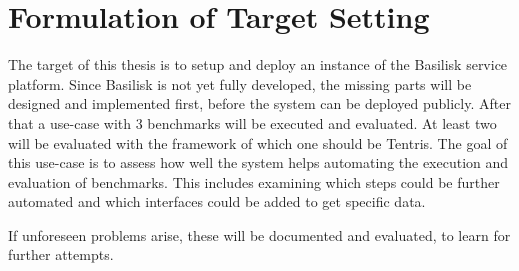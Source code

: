 \chapter{Formulation of Target Setting}
\label{ch:target_setting}

The target of this thesis is to setup and deploy an instance of the Basilisk service platform.
Since Basilisk is not yet fully developed, the missing parts will be designed and implemented first, before the system can be deployed publicly.
After that a use-case with 3 benchmarks will be executed and evaluated.
At least two \tsp{} will be evaluated with the framework of which one should be Tentris\cite{tentris}.
The goal of this use-case is to assess how well the system helps automating the execution and evaluation of benchmarks.
This includes examining which steps could be further automated and which interfaces could be added to get specific data.

If unforeseen problems arise, these will be documented and evaluated, to learn for further attempts.





%
%
%
